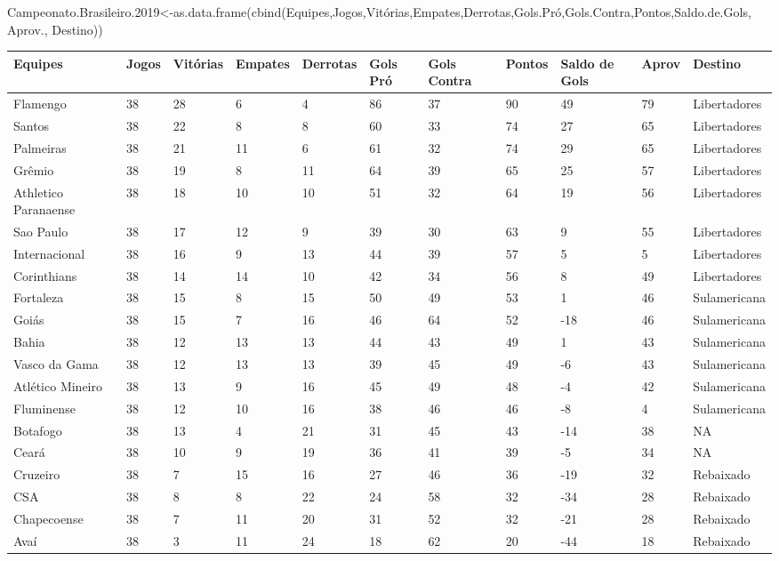 \documentclass[
]{book}
\newenvironment{Shaded}{\begin{snugshade}}{\end{snugshade}}
\newcommand{\FloatTok}[1]{\textcolor[rgb]{0.00,0.00,0.81}{#1}}
\newcommand{\FunctionTok}[1]{\textcolor[rgb]{0.00,0.00,0.00}{#1}}
\newcommand{\NormalTok}[1]{#1}
\newcommand{\OtherTok}[1]{\textcolor[rgb]{0.56,0.35,0.01}{#1}}
\begin{document}
\begin{Shaded}
\begin{Highlighting}[]
\NormalTok{Campeonato.Brasileiro}\FloatTok{.2019}\OtherTok{\textless{}{-}}\FunctionTok{as.data.frame}\NormalTok{(}\FunctionTok{cbind}\NormalTok{(Equipes,Jogos,Vitórias,Empates,Derrotas,Gols.Pró,Gols.Contra,Pontos,Saldo.de.Gols, Aprov., Destino))}
\end{Highlighting}
\end{Shaded}

\begin{table}
\centering\begingroup\fontsize{11.5}{13.5}\selectfont

\begin{tabular}{l|l|l|l|l|l|l|l|l|l|l}
\hline
Equipes & Jogos & Vitórias & Empates & Derrotas & Gols Pró & Gols Contra & Pontos & Saldo de Gols & Aprov  & Destino\\
\hline
Flamengo & 38 & 28 & 6 & 4 & 86 & 37 & 90 & 49 & 79 & Libertadores\\
\hline
Santos & 38 & 22 & 8 & 8 & 60 & 33 & 74 & 27 & 65 & Libertadores\\
\hline
Palmeiras & 38 & 21 & 11 & 6 & 61 & 32 & 74 & 29 & 65 & Libertadores\\
\hline
Grêmio & 38 & 19 & 8 & 11 & 64 & 39 & 65 & 25 & 57 & Libertadores\\
\hline
Athletico Paranaense & 38 & 18 & 10 & 10 & 51 & 32 & 64 & 19 & 56 & Libertadores\\
\hline
Sao Paulo & 38 & 17 & 12 & 9 & 39 & 30 & 63 & 9 & 55 & Libertadores\\
\hline
Internacional & 38 & 16 & 9 & 13 & 44 & 39 & 57 & 5 & 5 & Libertadores\\
\hline
Corinthians & 38 & 14 & 14 & 10 & 42 & 34 & 56 & 8 & 49 & Libertadores\\
\hline
Fortaleza & 38 & 15 & 8 & 15 & 50 & 49 & 53 & 1 & 46 & Sulamericana\\
\hline
Goiás & 38 & 15 & 7 & 16 & 46 & 64 & 52 & -18 & 46 & Sulamericana\\
\hline
Bahia & 38 & 12 & 13 & 13 & 44 & 43 & 49 & 1 & 43 & Sulamericana\\
\hline
Vasco da Gama & 38 & 12 & 13 & 13 & 39 & 45 & 49 & -6 & 43 & Sulamericana\\
\hline
Atlético Mineiro & 38 & 13 & 9 & 16 & 45 & 49 & 48 & -4 & 42 & Sulamericana\\
\hline
Fluminense & 38 & 12 & 10 & 16 & 38 & 46 & 46 & -8 & 4 & Sulamericana\\
\hline
Botafogo & 38 & 13 & 4 & 21 & 31 & 45 & 43 & -14 & 38 & NA\\
\hline
Ceará & 38 & 10 & 9 & 19 & 36 & 41 & 39 & -5 & 34 & NA\\
\hline
Cruzeiro & 38 & 7 & 15 & 16 & 27 & 46 & 36 & -19 & 32 & Rebaixado\\
\hline
CSA & 38 & 8 & 8 & 22 & 24 & 58 & 32 & -34 & 28 & Rebaixado\\
\hline
Chapecoense & 38 & 7 & 11 & 20 & 31 & 52 & 32 & -21 & 28 & Rebaixado\\
\hline
Avaí & 38 & 3 & 11 & 24 & 18 & 62 & 20 & -44 & 18 & Rebaixado\\
\hline
\end{tabular}
\endgroup{}
\end{table}
\end{document}
